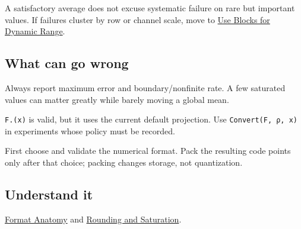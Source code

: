 A satisfactory average does not excuse systematic failure on rare but important values. If failures cluster by row or channel scale, move to \href{workflow\_\allowbreak{}blocks.md}{Use Blocks for Dynamic Range}.



\subsection{What can go wrong}



\label{7385351218440078181-dup2}{}


\begin{tcolorbox}[toptitle=-1mm,bottomtitle=1mm,colback=admonition-warning!50!white,colframe=admonition-warning,title=\textbf{MSE can hide the tail}]
Always report maximum error and boundary/nonfinite rate. A few saturated values can matter greatly while barely moving a global mean.

\end{tcolorbox}


\begin{tcolorbox}[toptitle=-1mm,bottomtitle=1mm,colback=admonition-warning!50!white,colframe=admonition-warning,title=\textbf{The constructor hides policy}]
\texttt{F.(x)} is valid, but it uses the current default projection. Use \texttt{Convert(F, ρ, x)} in experiments whose policy must be recorded.

\end{tcolorbox}


\begin{tcolorbox}[toptitle=-1mm,bottomtitle=1mm,colback=admonition-note!50!white,colframe=admonition-note,title=\textbf{Packing is a later decision}]
First choose and validate the numerical format. Pack the resulting code points only after that choice; packing changes storage, not quantization.

\end{tcolorbox}


\subsection{Understand it}



\label{5457362271576251363-dup1}{}


\href{concept\_\allowbreak{}format\_\allowbreak{}anatomy.md}{Format Anatomy} and \href{concept\_\allowbreak{}rounding\_\allowbreak{}saturation.md}{Rounding and Saturation}.



